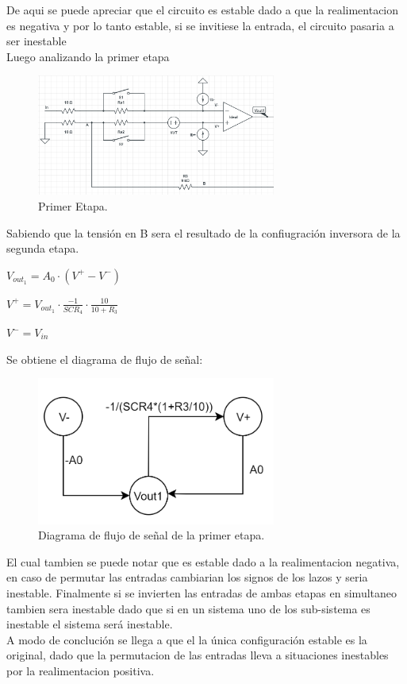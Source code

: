 De aqui se puede apreciar que el circuito es estable dado a que la realimentacion es negativa y por lo tanto estable, si se invitiese la entrada, el circuito pasaria a ser inestable\\
Luego analizando la primer etapa
\begin{figure}[H]	
	\centering
	\includegraphics[width=0.7\textwidth]{imagenes/PrimeraEtapa.PNG}
	\caption{Primer Etapa.}
	\label{fig:PrimerEtapa}
\end{figure}
Sabiendo que la tensión en B sera el resultado de la confiugración inversora de la segunda etapa.\\
\begin{center}$V_{out_1}=A_0 \cdot (V^+ - V^-)$\\\end{center}
\begin{center}$V^+= V_{out_1}\cdot \frac{-1}{SCR_4} \cdot \frac{10}{10+R_3} $\\\end{center}
\begin{center}$V^- = V_{in}$\\\end{center}
Se obtiene el diagrama de flujo de señal:
\begin{figure}[H]	
	\centering
	\includegraphics[width=0.7\textwidth]{imagenes/PrimerEtapaDiagrama.PNG}
	\caption{Diagrama de flujo de señal de la primer etapa.}
	\label{fig:PrimerEtapaDiagrama}
\end{figure}
El cual tambien se puede notar que es estable dado a la realimentacion negativa, en caso de permutar las entradas cambiarian los signos de los lazos y seria inestable.
Finalmente si se invierten las entradas de ambas etapas en simultaneo tambien sera inestable dado que si en un sistema uno de los sub-sistema es inestable el sistema será inestable.\\
A modo de conclución se llega a que el la única configuración estable es la original, dado que la permutacion de las entradas lleva a situaciones inestables por la realimentacion positiva.
